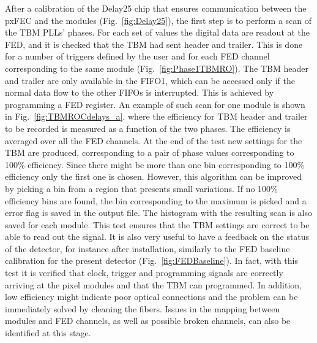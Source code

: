 After a calibration of the Delay25 chip that ensures communication between the pxFEC and the modules (Fig.~\ref{fig:Delay25}), the first step is to perform a scan of the TBM PLLs' phases.
For each set of values the digital data are readout at the FED, and it is checked that the TBM had sent header and trailer. This is done for a number of triggers defined by the user
and for each FED channel corresponding to the same module (Fig.~\ref{fig:Phase1TBMRO}).
The TBM header and trailer are only available in the FIFO1, which can be accessed only if the normal data flow to the other FIFOs is interrupted. This is achieved by programming a FED register.
An example of such scan for one module is shown in Fig.~\ref{fig:TBMROCdelays_a}. where the efficiency for TBM header and trailer to be recorded is measured as a function of the two phases.
The efficiency is averaged over all the FED channels.
At the end of the test new settings for the TBM are produced, corresponding to a pair of phase values corresponding to 100\% efficiency. Since there might be more than one bin corresponding to 100\% efficiency only the first one is chosen. However, this algorithm can be improved by picking a bin from a region that presents small variations. If no 100\% efficiency bins are found, the bin corresponding to the maximum is picked and a error flag is saved in the output file. The histogram with the resulting scan is also saved for each module.
This test ensures that the TBM settings are correct to be able to read out the signal. It is also very useful to have a feedback on the status of the detector, for instance after installation, similarly to the FED baseline calibration for the present detector (Fig.~\ref{fig:FEDBaseline}). In fact, with this test it is verified that clock, trigger and programming signals are correctly arriving at the pixel modules and that the TBM can programmed.
In addition, low efficiency might indicate poor optical connections and the problem can be immediately solved by cleaning the fibers.
Issues in the mapping between modules and FED channels, as well as possible broken channels, can also be identified at this stage.\\

